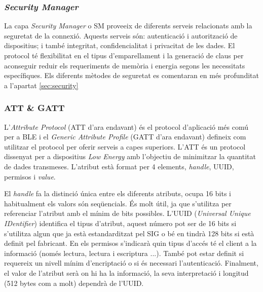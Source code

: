 \subsubsection{\textit{Security Manager}}
La capa \textit{Security Manager} o SM proveeix de diferents serveis relacionats amb la seguretat de la connexió.
Aquests serveis són: autenticació i autorització de dispositius; i també integritat, confidencialitat i privacitat de les dades.
El protocol té flexibilitat en el tipus d'emparellament i la generació de claus per aconseguir reduir els requeriments de memòria i energia segons les necessitats específiques.
Els diferents mètodes de seguretat es comentaran en més profunditat a l'apartat \ref{sec:security}

\subsubsection{ATT \& GATT}
L'\textit{Attribute Protocol} (ATT d'ara endavant) és el protocol d'aplicació més comú per a BLE i el \textit{Generic Attribute Profile} (GATT d'ara endavant) defineix com utilitzar el protocol per oferir serveis a capes superiors.
L'ATT és un protocol dissenyat per a dispositius \textit{Low Energy} amb l'objectiu de minimitzar la quantitat de dades transmeses. L'atribut està format per 4 elements, \textit{handle}, UUID, permisos  i \textit{value}.

El \textit{handle} fa la distinció única entre els diferents atributs, ocupa 16 bits i habitualment els valors són seqüencials. És molt útil, ja que s'utilitza per referenciar l'atribut amb el mínim de bits possibles.
L'UUID (\textit{Universal Unique IDentifier}) identifica el tipus d'atribut, aquest número pot ser de 16 bits si s'utilitza algun que ja està estandarditzat pel SIG o bé en tindrà 128 bits si està definit pel fabricant.
En els permisos s'indicarà quin tipus d'accés té el client a la informació (només lectura, lectura i escriptura ...). També pot estar definit si requereix un nivell mínim d'encriptació o si és necessari l'autenticació.
Finalment, el valor de l'atribut serà on hi ha la informació, la seva interpretació i longitud (512 bytes com a molt) dependrà de l'UUID.


